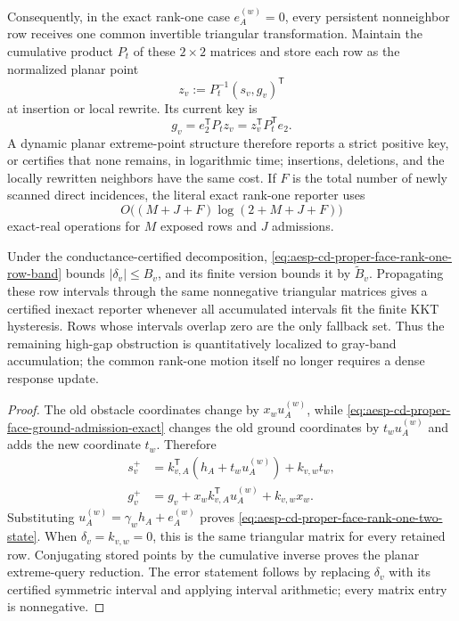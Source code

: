 \begin{proposition}
Consequently, in the exact rank-one case \(e_A^{(w)}=0\), every persistent
nonneighbor row receives one common invertible triangular transformation.
Maintain the cumulative product \(P_t\) of these \(2\times2\) matrices and
store each row as the normalized planar point
\begin{equation*}
 z_v:=P_t^{-1}(s_v,g_v)^{\mathsf T}
\end{equation*}
at insertion or local rewrite.  Its current key is
\begin{equation*}
 g_v=e_2^{\mathsf T}P_tz_v
     =z_v^{\mathsf T}P_t^{\mathsf T}e_2.
\end{equation*}
A dynamic planar extreme-point structure therefore reports a strict positive
key, or certifies that none remains, in logarithmic time; insertions,
deletions, and the locally rewritten neighbors have the same cost.  If \(F\)
is the total number of newly scanned direct incidences, the literal exact
rank-one reporter uses
\begin{equation*}
 O\bigl((M+J+F)\log(2+M+J+F)\bigr)
\end{equation*}
exact-real operations for \(M\) exposed rows and \(J\) admissions.

Under the conductance-certified decomposition,
\cref{eq:aesp-cd-proper-face-rank-one-row-band} bounds
\(|\delta_v|\leq B_v\), and its finite version bounds it by
\(\widetilde B_v\).  Propagating these row intervals through the same
nonnegative triangular matrices gives a certified inexact reporter whenever
all accumulated intervals fit the finite KKT hysteresis.  Rows whose
intervals overlap zero are the only fallback set.  Thus the remaining
high-gap obstruction is quantitatively localized to gray-band accumulation;
the common rank-one motion itself no longer requires a dense response update.
\end{proposition}

\begin{proof}
The old obstacle coordinates change by \(x_wu_A^{(w)}\), while
\cref{eq:aesp-cd-proper-face-ground-admission-exact} changes the old ground
coordinates by \(t_wu_A^{(w)}\) and adds the new coordinate \(t_w\).
Therefore
\begin{align*}
 s_v^+
 &=k_{v,A}^{\mathsf T}(h_A+t_wu_A^{(w)})+k_{v,w}t_w,\\
 g_v^+
 &=g_v+x_wk_{v,A}^{\mathsf T}u_A^{(w)}+k_{v,w}x_w.
\end{align*}
Substituting \(u_A^{(w)}=\gamma_wh_A+e_A^{(w)}\) proves
\cref{eq:aesp-cd-proper-face-rank-one-two-state}.  When
\(\delta_v=k_{v,w}=0\), this is the same triangular matrix for every retained
row.  Conjugating stored points by the cumulative inverse proves the planar
extreme-query reduction.  The error statement follows by replacing
\(\delta_v\) with its certified symmetric interval and applying interval
arithmetic; every matrix entry is nonnegative.
\end{proof}

